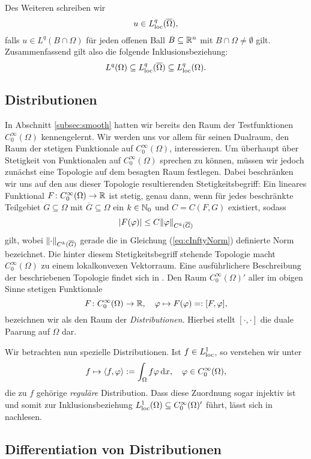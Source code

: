 Des Weiteren schreiben wir
$$
u \in L^q_{\operatorname{loc}}(\overline\Omega),
$$
falls $u \in L^q(B \cap \Omega)$ für jeden offenen Ball $B \subseteq \mathbb{R}^n$ mit $B \cap \Omega \neq \emptyset$ gilt.
Zusammenfassend gilt also die folgende Inklusionsbeziehung:
$$
L^q(\Omega) \subseteq L^q_{\operatorname{loc}}(\overline\Omega) \subseteq L^q_{\operatorname{loc}}(\Omega).
$$

\subsection{Distributionen}

In Abschnitt \ref{subsec:smooth} hatten wir bereits den Raum der Testfunktionen $C_0^\infty(\Omega)$ kennengelernt.
Wir werden uns vor allem für seinen Dualraum, den Raum der stetigen Funktionale auf $C_0^\infty(\Omega)$, interessieren.
Um überhaupt über Stetigkeit von Funktionalen auf $C_0^\infty(\Omega)$ sprechen zu können, müssen wir jedoch zunächst eine Topologie auf dem besagten Raum festlegen.
Dabei beschränken wir uns auf den aus dieser Topologie resultierenden Stetigkeitsbegriff:
Ein lineares Funktional $F \colon C_0^\infty(\Omega) \to \mathbb{R}$ ist stetig, genau dann, wenn für jedes beschränkte Teilgebiet $G \subseteq \Omega$ mit $\overline G \subseteq \Omega$ ein $k \in \mathbb{N}_0$ und $C = C(F,G)$ existiert, sodass
$$
|F(\varphi)| \leq C \lVert \varphi \rVert_{C^k(\overline G)}
$$
gilt, wobei $\lVert \cdot \rVert_{C^k(\overline G)}$ gerade die in Gleichung (\ref{eq:cInftyNorm}) definierte Norm bezeichnet.
Die hinter diesem Stetigkeitsbegriff stehende Topologie macht $C_0^\infty(\Omega)$ zu einem lokalkonvexen Vektorraum.
Eine ausführlichere Beschreibung der beschriebenen Topologie findet sich in \cite[S.433f.]{werner2011fa}.
Den Raum $C_0^\infty(\Omega)'$ aller im obigen Sinne stetigen Funktionale
$$
F \colon C_0^\infty(\Omega) \to \mathbb{R}, \quad \varphi \mapsto F(\varphi) =: [F, \varphi],
$$
bezeichnen wir als den Raum der \emph{Distributionen}.
Hierbei stellt $[\cdot,\cdot]$ die duale Paarung auf $\Omega$ dar. 

Wir betrachten nun spezielle Distributionen.
Ist $f \in L^1_{\operatorname{loc}}$, so verstehen wir unter 
$$
f \mapsto \langle f, \varphi \rangle := \int_\Omega f \varphi \, {\operatorname{d}\!{x}}, \quad \varphi \in C_0^\infty(\Omega), 
$$
die zu $f$ gehörige \emph{reguläre} Distribution.
Dass diese Zuordnung sogar injektiv ist und somit zur Inklusionsbeziehung $L^1_{\operatorname{loc}}(\Omega) \subseteq C^\infty_0(\Omega)'$ führt, lässt sich in \cite[S.432, Beispiel (a)]{werner2011fa} nachlesen.

\subsection{Differentiation von Distributionen}

